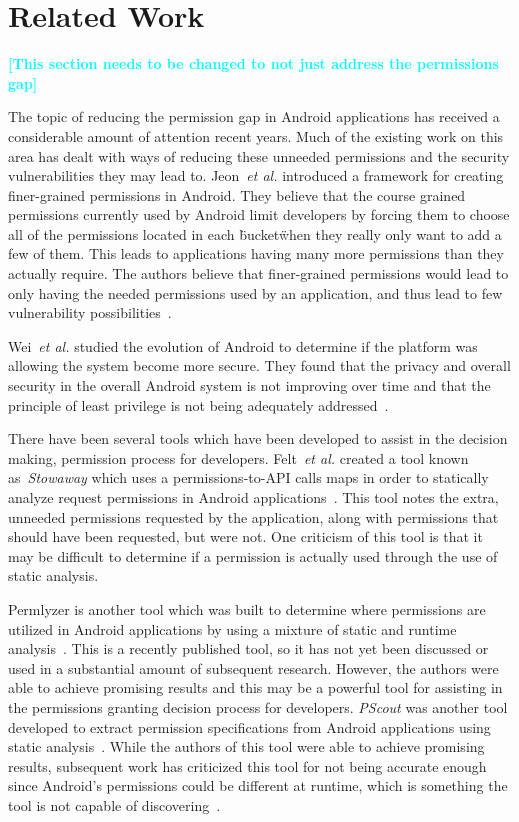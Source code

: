 \documentclass{sig-alternate}
\newcommand{\todo}[1]{\textcolor{cyan}{\textbf{[#1]}}}
\begin{document}
\section{Related Work}
\label{sec: relatedwork}

\todo{This section needs to be changed to not just address the permissions gap}

The topic of reducing the permission gap in Android applications has received a considerable amount of attention recent years. Much of the existing work on this area has dealt with ways of reducing these unneeded permissions and the security vulnerabilities they may lead to. Jeon~\emph{et al.} introduced a framework for creating finer-grained permissions in Android. They believe that the course grained permissions currently used by Android limit developers by forcing them to choose all of the permissions located in each \"bucket\" when they really only want to add a few of them. This leads to applications having many more permissions than they actually require. The authors believe that finer-grained permissions would lead to only having the needed permissions used by an application, and thus lead to few vulnerability possibilities~\cite{jeon2011dr}.


Wei~\emph{et al.} studied the evolution of Android to determine if the platform was allowing the system become more secure. They found that the privacy and overall security in the overall Android system is not improving over time and that the principle of least privilege is not being adequately addressed~\cite{Wei:2012:PEA:2420950.2420956}. %


There have been several tools which have been developed to assist in the decision making, permission process for developers. Felt~\emph{et al.} created a tool known as~\emph{Stowaway} which uses a permissions-to-API calls maps in order to statically analyze request permissions in Android applications~\cite{Felt:2011:APD:2046707.2046779}. This tool notes the extra, unneeded permissions requested by the application, along with permissions that should have been requested, but were not. One criticism of this tool is that it may be difficult to determine if a permission is actually used through the use of static analysis.

Permlyzer is another tool which was built to determine where permissions are utilized in Android applications by using a mixture of static and runtime analysis~\cite{6698893}. This is a recently published tool, so it has not yet been discussed or used in a substantial amount of subsequent research. However, the authors were able to achieve promising results and this may be a powerful tool for assisting in the permissions granting decision process for developers. \emph{PScout} was another tool developed to extract permission specifications from Android applications using static analysis~\cite{Au:2012:PAA:2382196.2382222}. While the authors of this tool were able to achieve promising results, subsequent work has criticized this tool for not being accurate enough since Android's permissions could be different at runtime, which is something the tool is not capable of discovering~\cite{zhang2013vetting}.
\end{document}
